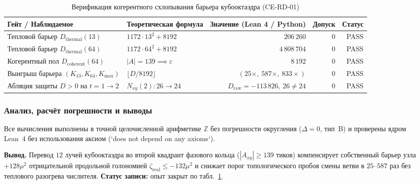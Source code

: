 \begin{table}[htbp]
\centering
\footnotesize
\setlength{\tabcolsep}{4pt}
\caption{Верификация когерентного схлопывания барьера кубооктаэдра (CE-RD-01)}
\label{tab:exp-ce-rd-01}
\begin{tabular}{@{}llrrr@{}}
\toprule
Гейт / Наблюдаемое & Теоретическая формула & Значение (Lean 4 / Python) & Допуск & Статус \\
\midrule
Тепловой барьер $D_{\mathrm{thermal}}(13)$ & $1172\cdot 13^2 + 8192$ & $206\,260$ & $0$ & PASS \\
Тепловой барьер $D_{\mathrm{thermal}}(64)$ & $1172\cdot 64^2 + 8192$ & $4\,808\,704$ & $0$ & PASS \\
Когерентный пол $D_{\mathrm{coherent}}(64)$ & $|A|=139 \implies \varepsilon$ & $8\,192$ & $0$ & PASS \\
Выигрыш барьера $(K_{13}, K_{64}, K_{\max})$ & $\lfloor D / 8192\rfloor$ & $(25\times,\ 587\times,\ 833\times)$ & $0$ & PASS \\
Абляция защиты $D>0$ на $t=1\to 2$ & $N_{xy}(2)\colon 26 \to 24$ & $D_{\mathrm{raw}}=-113\,826,\ 26\ne 24$ & $0$ & PASS \\
\bottomrule
\end{tabular}
\end{table}

\subsubsection*{Анализ, расчёт погрешности и выводы}
Все вычисления выполнены в точной целочисленной арифметике $\mathbb{Z}$ без погрешности округления ($\Delta = 0$, тип~B) и проверены ядром Lean~4 без использования аксиом (`does not depend on any axioms`).

\textbf{Вывод.}
Перевод $12$ лучей кубооктаэдра во второй квадрант фазового кольца ($|A_{xy}|\ge 139$ тиков) компенсирует собственный барьер узла $+128\mu^2$ отрицательной продольной голономией $\zeta_{\mathrm{real}}\le -132\mu^2$ и снижает порог топологического пробоя смены ветви в $25\text{--}587$ раз без теплового разогрева числителя.
\textbf{Статус записи:} опыт закрыт по табл.~\ref{tab:exp-ce-rd-01}.
